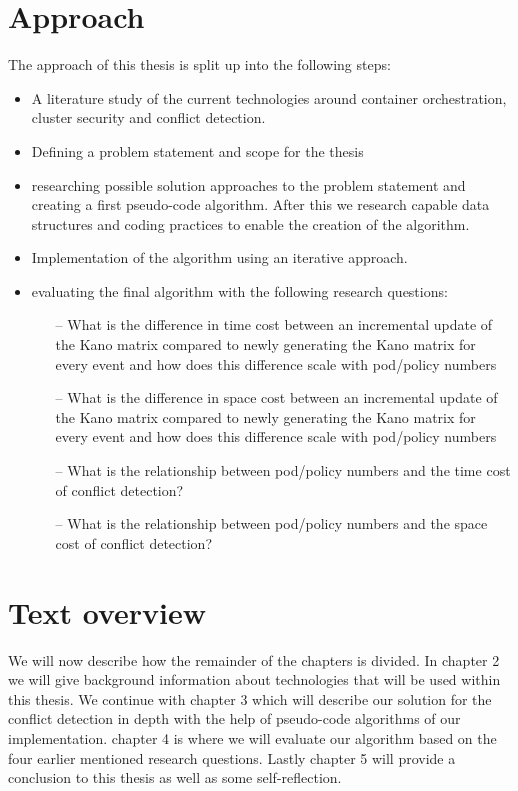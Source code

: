\section{Approach } \label{sec:approach}
The approach of this thesis is split up into the following steps:
\begin{itemize}
    \renewcommand{\labelitemi}{\scriptsize$\blacksquare$}
     \item A literature study of the current technologies around container orchestration, cluster security and conflict detection.
    \item Defining a problem statement and scope for the thesis
    \item researching possible solution approaches to the problem statement and creating a first pseudo-code algorithm. After this we research capable data structures and coding practices to enable the creation of the algorithm.
    \item Implementation of the algorithm using an iterative approach.
    \item evaluating the final algorithm with the following research questions:

    \begin{enumerate}
        \item[--] What is the difference in time cost between an incremental update of the Kano matrix compared to newly generating the Kano matrix for every event and how does this difference scale with pod/policy numbers
        \item[--] What is the difference in space cost between an incremental update of the Kano matrix compared to newly generating the Kano matrix for every event and how does this difference scale with pod/policy numbers
        \item[--] What is the relationship between pod/policy numbers and the time cost of conflict detection?
        \item[--] What is the relationship between pod/policy numbers and the space cost of conflict detection?
    \end{enumerate}
\end{itemize}


\section{Text overview} \label{sec:textoverview}
We will now describe how the remainder of the chapters is divided. In chapter 2 we will give background information about technologies that will be used within this thesis. We continue with chapter 3 which will describe our solution for the conflict detection in depth with the help of pseudo-code algorithms of our implementation. chapter 4 is where we will evaluate our algorithm based on the four earlier mentioned research questions. Lastly chapter 5 will provide a conclusion to this thesis as well as some self-reflection.
\cleardoublepage

